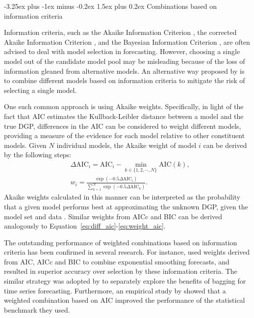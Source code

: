 \documentclass[11pt]{article}
\makeatletter
\renewcommand{\paragraph}{\@startsection{paragraph}{4}{0ex}%
   {-3.25ex plus -1ex minus -0.2ex}%
   {1.5ex plus 0.2ex}%
   {\normalfont\normalsize\bfseries}}
\makeatother
\begin{document}
\paragraph{Combinations based on information criteria}

Information criteria, such as the Akaike Information Criterion \citep[AIC,]{Akaike1974-ya}, the corrected Akaike Information Criterion \citep[AICc,][]{Sugiura1978-xm}, and the Bayesian Information Criterion \citep[BIC,][]{Schwarz1978-cz}, are often advised to deal with model selection in forecasting. However, choosing a single model out of the candidate model pool may be misleading because of the loss of information gleaned from alternative models. An alternative way proposed by \cite{Burnham2002-us} is to combine different models based on information criteria to mitigate the risk of selecting a single model.

One such common approach is using Akaike weights. Specifically, in light of the fact that AIC estimates the Kullback-Leibler distance \citep{Kullback1951-hl} between a model and the true DGP, differences in the AIC can be considered to weight different models, providing a measure of the evidence for each model relative to other constituent models. Given $N$ individual models, the Akaike weight of model $i$ can be derived by the following steps:
\begin{align}
&\Delta \mathrm{AIC}_{i}=\mathrm{AIC}_{i}-\min _{k \in \{1,2,\cdots,N\}} \mathrm{AIC}(k), \label{eq:diff_aic}\\
&w_{i}=\frac{\exp (-0.5 \Delta \mathrm{AIC}_{i})}{\sum_{k=1}^{N} \exp \left(-0.5 \Delta \mathrm{AIC}_{k}\right)}. \label{eq:weight_aic}
\end{align}
Akaike weights calculated in this manner can be interpreted as the probability that a given model performs best at approximating the unknown DGP, given the model set and data \citep{Kolassa2011-ai}. Similar weights from AICc and BIC can be derived analogously to Equation~\eqref{eq:diff_aic}-\eqref{eq:weight_aic}.

The outstanding performance of weighted combinations based on information criteria has been confirmed in several research. For instance, \cite{Kolassa2011-ai} used weights derived from AIC, AICc and BIC to combine exponential smoothing forecasts, and resulted in superior accuracy over selection by these information criteria. The similar strategy was adopted by \cite{Petropoulos2018-fw} to separately explore the benefits of bagging for time series forecasting. Furthermore, an empirical study by \cite{Petropoulos2018-ad} showed that a weighted combination based on AIC improved the performance of the statistical benchmark they used.
\end{document}
